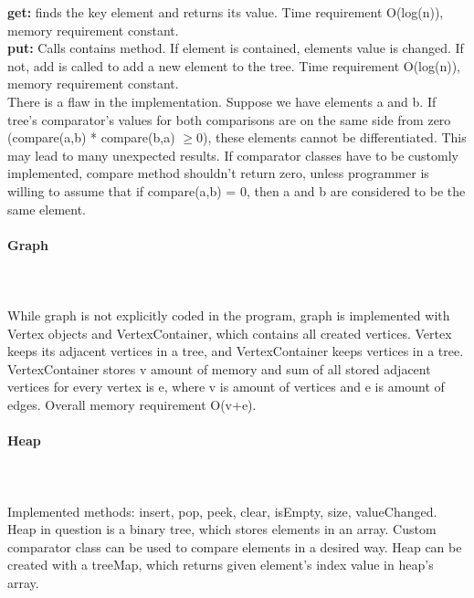 \documentclass[a4paper,12pt]{article}
\begin{document}
\textbf{get:} finds the key element and returns its value. Time requirement O(log(n)), memory requirement constant.
\\

\textbf{put:} Calls contains method. If element is contained, elements value is changed. If not, add is called to add a new element to the tree. Time requirement O(log(n)), memory requirement constant.
\\

There is a flaw in the implementation. Suppose we have elements a and b. If tree's comparator's values for both comparisons are on the same side from zero (compare(a,b) * compare(b,a) $\geq{0}$), these elements cannot be differentiated. This may lead to many unexpected results. If comparator classes have to be customly implemented, compare method shouldn't return zero, unless programmer is willing to assume that if compare(a,b) = 0, then a and b are considered to be the same element.

\paragraph{\large Graph} \hspace{0pt} \\
\\
While graph is not explicitly coded in the program, graph is implemented with Vertex objects and VertexContainer, which contains all created vertices. Vertex keeps its adjacent vertices in a tree, and VertexContainer keeps vertices in a tree. VertexContainer stores v amount of memory and sum of all stored adjacent vertices for every vertex is e, where v is amount of vertices and e is amount of edges. Overall memory requirement O(v+e).
\\

\paragraph{\large Heap} \hspace{0pt} \\
\\
Implemented methods: insert, pop, peek, clear, isEmpty, size, valueChanged.
\\
Heap in question is a binary tree, which stores elements in an array. Custom comparator class can be used to compare elements in a desired way. Heap can be created with a treeMap, which returns given element's index value in heap's array.\\
\end{document}
